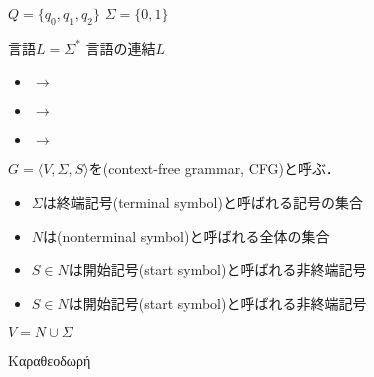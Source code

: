 \documentclass[../main.tex]{subfiles}
\begin{document}
\(Q = \{q_0, q_1, q_2\}\)
\(\Sigma = \{0, 1\}\)

\begin{definition}
言語\(L = \Sigma^{\mathord{*}}\)
言語の連結\(L\)
\end{definition}

\begin{itemize}
    \item {} \(\to\)  
    \item {} \(\to\) 
    \item {} \(\to\) 
\end{itemize}

\begin{figure}
    \centering
\end{figure}

\begin{definition} \(G = \langle V, \Sigma, S \rangle\)を(context-free grammar, CFG)と呼ぶ．
\begin{itemize}
    \item \(\Sigma\)は終端記号(terminal symbol)と呼ばれる記号の集合
    \item \(N\)は(nonterminal symbol)と呼ばれる全体の集合
    \item \(S \in N\)は開始記号(start symbol)と呼ばれる非終端記号
    \item \(S \in N\)は開始記号(start symbol)と呼ばれる非終端記号
\end{itemize}

\(V = N \cup \Sigma\)

\end{definition}

Καραθεοδωρή
\end{document}
